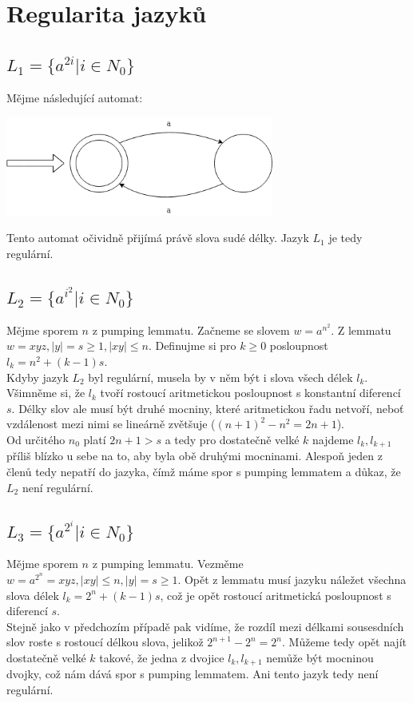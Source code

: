 \documentclass{scrartcl}
\begin{document}
\section{Regularita jazyků}
\subsection{$L_1 = \{a^{2i} \vert i \in N_0 \}$}
Mějme následující automat:
\begin{center}
    \includegraphics[width=250pt]{automat1.png}
\end{center}

Tento automat očividně přijímá právě slova sudé délky. Jazyk $L_1$ je tedy regulární.

\subsection{$L_2 = \{a^{i^2} \vert i \in N_0 \}$}

Mějme sporem $n$ z pumping lemmatu. Začneme se slovem $w = a^{n^2}$. Z lemmatu $w = xyz, \vert y \vert = s \geq 1, \vert xy \vert \leq n$. Definujme si pro $k \geq 0$ posloupnost $l_k = n^2 + (k-1)s$. \\

Kdyby jazyk $L_2$ byl regulární, musela by v něm být i slova všech délek $l_k$. Všimněme si, že $l_k$ tvoří rostoucí aritmetickou posloupnost s konstantní diferencí $s$. Délky slov ale musí být druhé mocniny, které aritmetickou řadu netvoří, neboť vzdálenost mezi nimi se lineárně zvětšuje ($(n+1)^2 - n^2 = 2n+1$). \\

Od určitého $n_0$ platí $2n+1 > s$ a tedy pro dostatečně velké $k$ najdeme $l_k, l_{k+1}$ příliš blízko u sebe na to, aby byla obě druhými mocninami. Alespoň jeden z členů tedy nepatří do jazyka, čímž máme spor s pumping lemmatem a důkaz, že $L_2$ není regulární.

\subsection{$L_3 = \{a^{2^i} \vert i \in N_0 \}$}

Mějme sporem $n$ z pumping lemmatu. Vezměme $w = a^{2^n} = xyz, \vert xy \vert \leq n, \vert y \vert = s \geq 1$. Opět z lemmatu musí jazyku náležet všechna slova délek $l_k = 2^n + (k-1)s$, což je opět rostoucí aritmetická posloupnost s diferencí $s$. \\

Stejně jako v předchozím případě pak vidíme, že rozdíl mezi délkami sousesdních slov roste s rostoucí délkou slova, jelikož $2^{n+1} - 2^n = 2^n$. Můžeme tedy opět najít dostatečně velké $k$ takové, že jedna z dvojice $l_k, l_{k+1}$ nemůže být mocninou dvojky, což nám dává spor s pumping lemmatem. Ani tento jazyk tedy není regulární.
\end{document}
